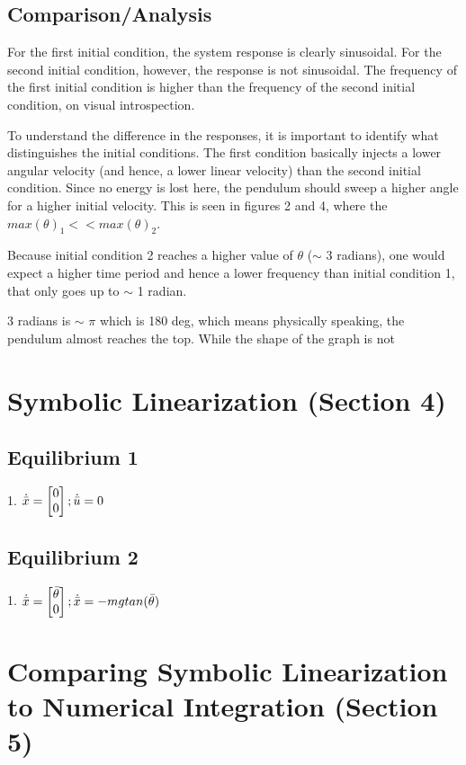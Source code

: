 \documentclass[10pt]{article}
\begin{document}
\subsection{Comparison/Analysis}
    For the first initial condition, the system response is clearly sinusoidal. For the second initial condition, however, the response is not sinusoidal. The frequency of the first initial condition is higher than the frequency of the second initial condition, on visual introspection. 
    
    To understand the difference in the responses, it is important to identify what distinguishes the initial conditions. The first condition basically injects a lower angular velocity (and hence, a lower linear velocity) than the second initial condition. Since no energy is lost here, the pendulum should sweep a higher angle for a higher initial velocity. This is seen in figures 2 and 4, where the \begin{math}
     max(\theta)_1 << max(\theta)_2
    \end{math}.
    
    Because initial condition 2 reaches a higher value of $\theta$ ($\sim$ 3 radians), one would expect a higher time period and hence a lower frequency than initial condition 1, that only goes up to $\sim$ 1 radian. 
    
    3 radians is $\sim$ $\pi$ which is 180 deg, which means physically speaking, the pendulum almost reaches the top. While the shape of the graph is not 
    

\section{Symbolic Linearization (Section 4)}

\subsection{Equilibrium 1}
\begin{center}
    1.
    \begin{math}
     \dot{\Bar{x}} = 
     \begin{bmatrix}
     0\\ 0
     \end{bmatrix}
     ;
     \dot{\Bar{u}} = 0
    \end{math}
\end{center}

\subsection{Equilibrium 2}
\begin{center}
    1.
    \begin{math}
     \dot{\Bar{x}} = 
     \begin{bmatrix}
     \Bar{\theta} \\ 0
     \end{bmatrix}
     ;
     \dot{\Bar{x}} = -mg tan(\Bar{\theta})
    \end{math}
\end{center}


\section{Comparing Symbolic Linearization to Numerical Integration (Section 5)}
\end{document}
